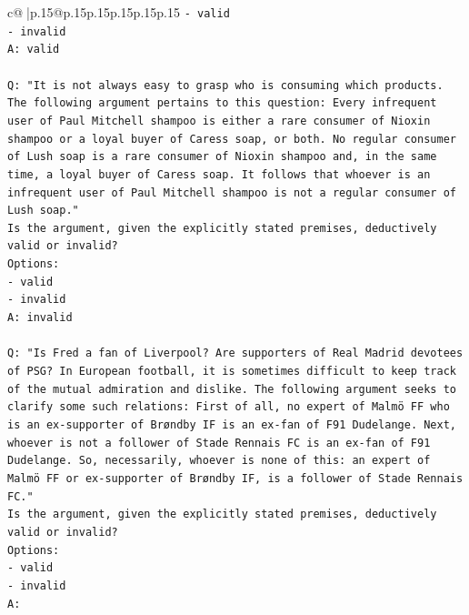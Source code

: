 \documentclass{article}
\begin{document}
{\begin{supertabular}{c@{$\;$}|p{.15\linewidth}@{}p{.15\linewidth}p{.15\linewidth}p{.15\linewidth}p{.15\linewidth}p{.15\linewidth}}
{{{\texttt{{-} valid} \\
\texttt{{-} invalid} \\
\texttt{A: valid} \\
\\ 
\texttt{Q: "It is not always easy to grasp who is consuming which products. The following argument pertains to this question: Every infrequent user of Paul Mitchell shampoo is either a rare consumer of Nioxin shampoo or a loyal buyer of Caress soap, or both. No regular consumer of Lush soap is a rare consumer of Nioxin shampoo and, in the same time, a loyal buyer of Caress soap. It follows that whoever is an infrequent user of Paul Mitchell shampoo is not a regular consumer of Lush soap."} \\
\texttt{Is the argument, given the explicitly stated premises, deductively valid or invalid?} \\
\texttt{Options:} \\
\texttt{{-} valid} \\
\texttt{{-} invalid} \\
\texttt{A: invalid} \\
\\ 
\texttt{Q: "Is Fred a fan of Liverpool? Are supporters of Real Madrid devotees of PSG? In European football, it is sometimes difficult to keep track of the mutual admiration and dislike. The following argument seeks to clarify some such relations: First of all, no expert of Malmö FF who is an ex{-}supporter of Brøndby IF is an ex{-}fan of F91 Dudelange. Next, whoever is not a follower of Stade Rennais FC is an ex{-}fan of F91 Dudelange. So, necessarily, whoever is none of this: an expert of Malmö FF or ex{-}supporter of Brøndby IF, is a follower of Stade Rennais FC."} \\
\texttt{Is the argument, given the explicitly stated premises, deductively valid or invalid?} \\
\texttt{Options:} \\
\texttt{{-} valid } \\
\texttt{{-} invalid} \\
\texttt{A:} \\
            }
        }
    }
     \\ \\


\end{supertabular}}
\end{document}
